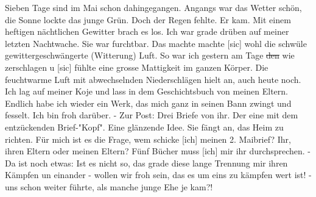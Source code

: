 \def\day{7. Mai 1943}
\mktitle

Sieben Tage sind im Mai schon dahingegangen.
Angangs war das Wetter sch\"{o}n, die Sonne lockte das junge Gr\"{u}n.
Doch der Regen fehlte.
Er kam.
Mit einem heftigen n\"{a}chtlichen Gewitter brach es los.
Ich war grade dr\"{u}ben auf meiner letzten Nachtwache.
Sie war furchtbar.
Das machte machte{\color{red} [sic] } wohl die schw\"{u}le gewittergeschw\"{a}ngerte (Witterung) Luft.
So war ich gestern am Tage \st{den} wie zerschlagen u{\color{red} [sic] } f\"{u}hlte eine grosse Mattigkeit im ganzen K\"{o}rper.
Die feuchtwarme Luft mit abwechselnden Niederschl\"{a}gen hielt an, auch heute noch.
Ich lag auf meiner Koje und lass in dem Geschichtsbuch von meinen Eltern.
Endlich habe ich wieder ein Werk, das mich ganz in seinen Bann zwingt und fesselt.
Ich bin froh dar\"{u}ber.
- Zur Post: Drei Briefe von ihr.
Der eine mit dem entz\"{u}ckenden Brief-"Kopf".
Eine gl\"{a}nzende Idee.
Sie f\"{a}ngt an, das Heim zu richten.
F\"{u}r mich ist es die Frage, wem schicke {\color{red} [ich] } meinen 2. Maibrief?
Ihr, ihren Eltern oder meinen Eltern?
F\"{u}nf B\"{u}cher muss {\color{red} [ich] } mir ihr durchsprechen.
- Da ist noch etwas: Ist es nicht so, das grade diese lange Trennung mir ihren K\"{a}mpfen un einander - wollen wir froh sein, das es um eins zu k\"{a}mpfen wert ist! - uns schon weiter f\"{u}hrte, als manche junge Ehe je kam?!

\clearpage

